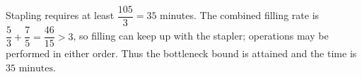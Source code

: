 Stapling requires at least $\dfrac{105}{3}=35$ minutes. The combined filling rate is $\dfrac{5}{3}+\dfrac{7}{5}=\dfrac{46}{15}>3$, so filling can keep up with the stapler; operations may be performed in either order. Thus the bottleneck bound is attained and the time is $\boxed{35\text{ minutes}}$.
